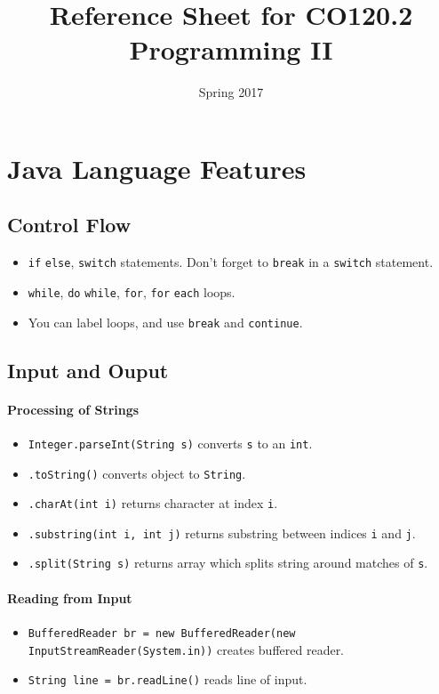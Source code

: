 \documentclass[twocolumn,english]{article}
\begin{document}
\title{Reference Sheet for CO120.2 Programming II}


\date{Spring 2017}

\maketitle

\section{Java Language Features}


\subsection{Control Flow}
\begin{itemize}
\item \texttt{if} \texttt{else}, \texttt{switch} statements. Don't forget
to \texttt{break} in a \texttt{switch} statement.
\item \texttt{while}, \texttt{do} \texttt{while}, \texttt{for}, \texttt{for}
\texttt{each} loops.
\item You can label loops, and use \texttt{break} and \texttt{continue}.
\end{itemize}

\subsection{Input and Ouput}


\paragraph{Processing of Strings}
\begin{itemize}
\item \texttt{Integer.parseInt(String s)} converts \texttt{s} to an \texttt{int}.
\item \texttt{.toString()} converts object to \texttt{String}.
\item \texttt{.charAt(int i)} returns character at index \texttt{i}.
\item \texttt{.substring(int i, int j)} returns substring between indices
\texttt{i} and \texttt{j}.
\item \texttt{.split(String s)} returns array which splits string around
matches of \texttt{s}.
\end{itemize}

\paragraph{Reading from Input}
\begin{itemize}
\item \texttt{BufferedReader br = new BufferedReader(new InputStreamReader(System.in))}
creates buffered reader.
\item \texttt{String line = br.readLine()} reads line of input.
\end{itemize}
\end{document}
